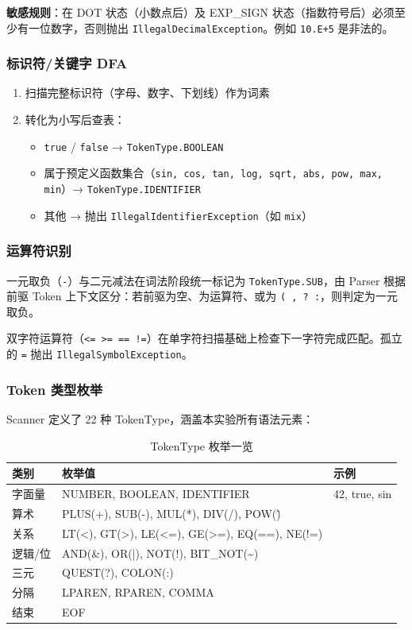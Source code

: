 \documentclass[a4paper]{article}
\begin{document}
\textbf{敏感规则}：在 DOT 状态（小数点后）及 EXP\_SIGN 状态（指数符号后）必须至少有一位数字，否则抛出 \texttt{IllegalDecimalException}。例如 \texttt{10.E+5} 是非法的。

\subsubsection{标识符/关键字 DFA}

\begin{enumerate}
    \item 扫描完整标识符（字母、数字、下划线）作为词素
    \item 转化为小写后查表：
    \begin{itemize}
        \item \texttt{true} / \texttt{false} → \texttt{TokenType.BOOLEAN}
        \item 属于预定义函数集合（\texttt{sin, cos, tan, log, sqrt, abs, pow, max, min}）→ \texttt{TokenType.IDENTIFIER}
        \item 其他 → 抛出 \texttt{IllegalIdentifierException}（如 \texttt{mix}）
    \end{itemize}
\end{enumerate}

\subsubsection{运算符识别}

一元取负（\texttt{-}）与二元减法在词法阶段统一标记为 \texttt{TokenType.SUB}，由 Parser 根据前驱 Token 上下文区分：若前驱为空、为运算符、或为 \texttt{( , ? :}，则判定为一元取负。

双字符运算符（\texttt{<= >= == !=}）在单字符扫描基础上检查下一字符完成匹配。孤立的 \texttt{=} 抛出 \texttt{IllegalSymbolException}。

\subsubsection{Token 类型枚举}

Scanner 定义了 22 种 TokenType，涵盖本实验所有语法元素：

\begin{table}[H]
\centering
\caption{TokenType 枚举一览}
\begin{tabular}{@{}lll@{}}
\toprule
\textbf{类别} & \textbf{枚举值} & \textbf{示例} \\
\midrule
字面量 & NUMBER, BOOLEAN, IDENTIFIER & 42, true, sin \\
算术 & PLUS(+), SUB(-), MUL(*), DIV(/), POW(\^) & \\
关系 & LT(<), GT(>), LE(<=), GE(>=), EQ(==), NE(!=) & \\
逻辑/位 & AND(\&), OR(|), NOT(!), BIT\_NOT(\textasciitilde) & \\
三元 & QUEST(?), COLON(:) & \\
分隔 & LPAREN, RPAREN, COMMA & \\
结束 & EOF & \\
\bottomrule
\end{tabular}
\end{table}
\end{document}
